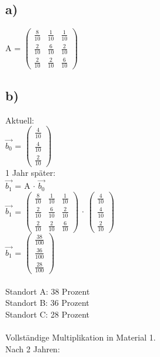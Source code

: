 \documentclass{article}
\begin{document}
	\subsection*{a)}
	A = 
	$\left(\begin{array}{ccc}
	 \frac{8}{10} & \frac{1}{10} & \frac{1}{10} \\ \frac{2}{10} & \frac{6}{10} & \frac{2}{10} \\ \frac{2}{10} & \frac{2}{10} &\frac{6}{10}
	\end{array}\right)$
	\subsection*{b)}
	Aktuell: \\
	$\vec{b_{0}}$ = 
	$
	\left(\begin{array}{c}
	\frac{4}{10} \\ \frac{4}{10} \\ \frac{2}{10} 
	\end{array}\right)
	$ \\
	1 Jahr später: \\
	$\vec{b_{1}}$ = A $\cdot$ $\vec{b_{0}}$ \\
	$\vec{b_{1}}$ =
	$\left(\begin{array}{ccc}
	\frac{8}{10} & \frac{1}{10} & \frac{1}{10} \\ \frac{2}{10} & \frac{6}{10} & \frac{2}{10} \\ \frac{2}{10} & \frac{2}{10} &\frac{6}{10}
	\end{array}\right)$ 
	$\cdot$
	$
	\left(\begin{array}{c}
	\frac{4}{10} \\ \frac{4}{10} \\ \frac{2}{10} 
	\end{array}\right)
	$ \\
	$\vec{b_{1}}$ =
	$\left(\begin{array}{c}
	 \frac{38}{100} \\ \frac{36}{100} \\ \frac{28}{100}
	\end{array}\right)$ \\ \\
	Standort A: 38 Prozent \\
	Standort B: 36 Prozent \\
	Standort C: 28 Prozent \\ \\
	Vollständige Multiplikation in Material 1. \\
	Nach 2 Jahren: \\
\end{document}
